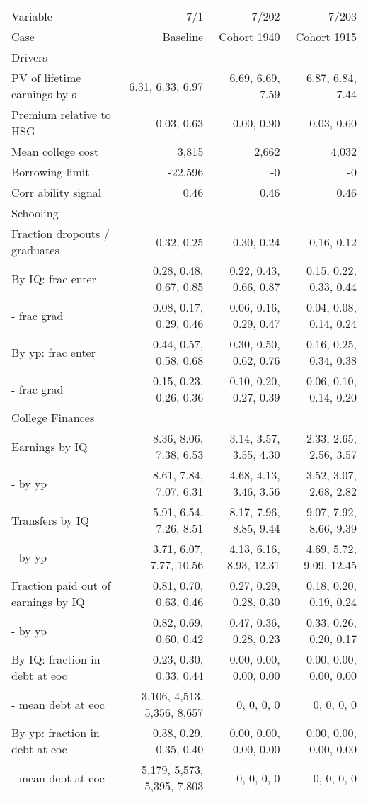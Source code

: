 \begin{tabular}{lrrr}
\hline
Variable & 7/1  & 7/202  & 7/203  \\
Case & Baseline  & Cohort 1940  & Cohort 1915  \\
Drivers &   &   &   \\
PV of lifetime earnings by s & 6.31, 6.33, 6.97  & 6.69, 6.69, 7.59  & 6.87, 6.84, 7.44  \\
Premium relative to HSG & 0.03, 0.63  & 0.00, 0.90  & -0.03, 0.60  \\
Mean college cost & 3,815  & 2,662  & 4,032  \\
Borrowing limit & -22,596  & -0  & -0  \\
Corr ability signal & 0.46  & 0.46  & 0.46  \\
\hline
Schooling &   &   &   \\
Fraction dropouts / graduates & 0.32, 0.25  & 0.30, 0.24  & 0.16, 0.12  \\
By IQ: frac enter & 0.28, 0.48, 0.67, 0.85  & 0.22, 0.43, 0.66, 0.87  & 0.15, 0.22, 0.33, 0.44  \\
- frac grad & 0.08, 0.17, 0.29, 0.46  & 0.06, 0.16, 0.29, 0.47  & 0.04, 0.08, 0.14, 0.24  \\
By yp: frac enter & 0.44, 0.57, 0.58, 0.68  & 0.30, 0.50, 0.62, 0.76  & 0.16, 0.25, 0.34, 0.38  \\
- frac grad & 0.15, 0.23, 0.26, 0.36  & 0.10, 0.20, 0.27, 0.39  & 0.06, 0.10, 0.14, 0.20  \\
\hline
College Finances &   &   &   \\
Earnings by IQ & 8.36, 8.06, 7.38, 6.53  & 3.14, 3.57, 3.55, 4.30  & 2.33, 2.65, 2.56, 3.57  \\
- by yp & 8.61, 7.84, 7.07, 6.31  & 4.68, 4.13, 3.46, 3.56  & 3.52, 3.07, 2.68, 2.82  \\
Transfers by IQ & 5.91, 6.54, 7.26, 8.51  & 8.17, 7.96, 8.85, 9.44  & 9.07, 7.92, 8.66, 9.39  \\
- by yp & 3.71, 6.07, 7.77, 10.56  & 4.13, 6.16, 8.93, 12.31  & 4.69, 5.72, 9.09, 12.45  \\
Fraction paid out of earnings by IQ & 0.81, 0.70, 0.63, 0.46  & 0.27, 0.29, 0.28, 0.30  & 0.18, 0.20, 0.19, 0.24  \\
- by yp & 0.82, 0.69, 0.60, 0.42  & 0.47, 0.36, 0.28, 0.23  & 0.33, 0.26, 0.20, 0.17  \\
By IQ: fraction in debt at eoc & 0.23, 0.30, 0.33, 0.44  & 0.00, 0.00, 0.00, 0.00  & 0.00, 0.00, 0.00, 0.00  \\
- mean debt at eoc & 3,106, 4,513, 5,356, 8,657  & 0, 0, 0, 0  & 0, 0, 0, 0  \\
By yp: fraction in debt at eoc & 0.38, 0.29, 0.35, 0.40  & 0.00, 0.00, 0.00, 0.00  & 0.00, 0.00, 0.00, 0.00  \\
- mean debt at eoc & 5,179, 5,573, 5,395, 7,803  & 0, 0, 0, 0  & 0, 0, 0, 0  \\
\hline
\end{tabular}%
